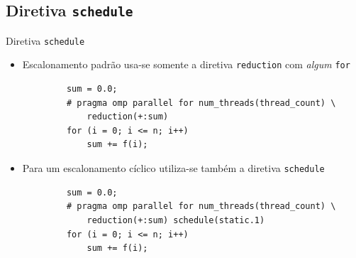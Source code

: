	\subsection{Diretiva {\tt schedule}}
	\begin{frame}[fragile]{Diretiva {\tt schedule}}
		\begin{itemize}
			\item Escalonamento padrão usa-se somente a diretiva {\tt reduction} com \textit{algum} {\tt for}
		\end{itemize}
		\begin{verbatim}
			sum = 0.0;
			# pragma omp parallel for num_threads(thread_count) \
				reduction(+:sum)		
			for (i = 0; i <= n; i++)
				sum += f(i);
		\end{verbatim}

		\begin{itemize}
			\item Para um escalonamento cíclico utiliza-se também a diretiva {\tt schedule}
		\end{itemize}
		
		\begin{verbatim}
			sum = 0.0;
			# pragma omp parallel for num_threads(thread_count) \
				reduction(+:sum) schedule(static.1)
			for (i = 0; i <= n; i++)
				sum += f(i);
		\end{verbatim}
\end{frame}

